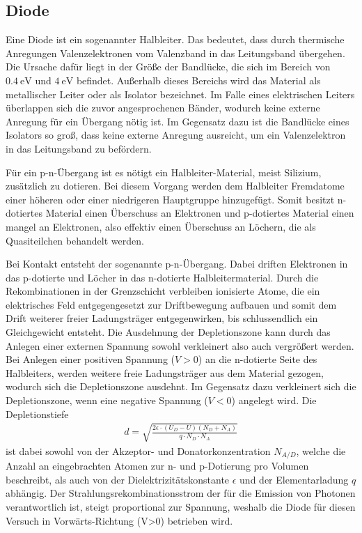 \subsection{Diode}
\label{sec:diode}

Eine Diode ist ein sogenannter Halbleiter. Das bedeutet, dass durch thermische Anregungen Valenzelektronen vom Valenzband in das Leitungsband übergehen. Die Ursache dafür liegt in der Größe der Bandlücke, die sich im Bereich von $\SI{0.4}{\electronvolt}$ und  $\SI{4}{\electronvolt}$ befindet. Außerhalb dieses Bereichs wird das Material als metallischer Leiter oder als Isolator bezeichnet. Im Falle eines elektrischen Leiters überlappen sich die zuvor angesprochenen Bänder, wodurch keine externe Anregung für ein Übergang nötig ist. Im Gegensatz dazu ist die Bandlücke eines Isolators so groß, dass keine externe Anregung ausreicht, um ein Valenzelektron in das Leitungsband zu befördern. 

Für ein p-n-Übergang ist es nötigt ein Halbleiter-Material, meist Silizium, zusätzlich zu dotieren. Bei diesem Vorgang werden dem Halbleiter Fremdatome einer höheren oder einer niedrigeren Hauptgruppe hinzugefügt. Somit besitzt n-dotiertes Material einen Überschuss an Elektronen und p-dotiertes Material einen mangel an Elektronen, also effektiv einen Überschuss an Löchern, die als Quasiteilchen behandelt werden. 

Bei Kontakt entsteht der sogenannte p-n-Übergang. Dabei driften Elektronen in das p-dotierte und Löcher in das n-dotierte Halbleitermaterial. Durch die Rekombinationen in der Grenzschicht verbleiben ionisierte Atome, die ein elektrisches Feld entgegengesetzt zur Driftbewegung aufbauen und somit dem Drift weiterer freier Ladungsträger entgegenwirken, bis schlussendlich ein Gleichgewicht entsteht. Die Ausdehnung der Depletionszone kann durch das Anlegen einer externen Spannung sowohl verkleinert also auch vergrößert werden. Bei Anlegen einer positiven Spannung ($V>0$) an die n-dotierte Seite des Halbleiters, werden weitere freie Ladungsträger aus dem Material gezogen, wodurch sich die Depletionszone ausdehnt. Im Gegensatz dazu verkleinert sich die Depletionszone, wenn eine negative Spannung ($V<0$) angelegt wird. Die Depletionstiefe
\begin{align}
	d=\sqrt{\frac{2\epsilon\cdot(U_D-U)(N_D+N_A)}{q\cdot N_D\cdot N_A}}
\end{align} 
ist dabei sowohl von der Akzeptor- und Donatorkonzentration $N_{A/D}$, welche die Anzahl an eingebrachten Atomen zur n- und p-Dotierung pro Volumen beschreibt, als auch von der Dielektrizitätskonstante $\epsilon$ und der Elementarladung $q$ abhängig. Der Strahlungsrekombinationsstrom der für die Emission von Photonen verantwortlich ist, steigt proportional zur Spannung, weshalb die Diode für diesen Versuch in Vorwärts-Richtung (V>0) betrieben wird.

